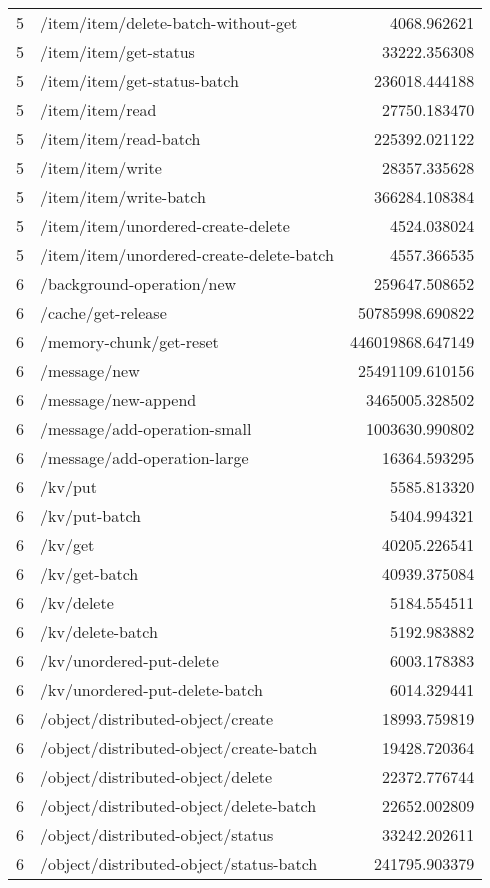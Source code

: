 \begin{longtable}{rlr}
5 & /item/item/delete-batch-without-get & 4068.962621 \\
5 & /item/item/get-status & 33222.356308 \\
5 & /item/item/get-status-batch & 236018.444188 \\
5 & /item/item/read & 27750.183470 \\
5 & /item/item/read-batch & 225392.021122 \\
5 & /item/item/write & 28357.335628 \\
5 & /item/item/write-batch & 366284.108384 \\
5 & /item/item/unordered-create-delete & 4524.038024 \\
5 & /item/item/unordered-create-delete-batch & 4557.366535 \\
6 & /background-operation/new & 259647.508652 \\
6 & /cache/get-release & 50785998.690822 \\
6 & /memory-chunk/get-reset & 446019868.647149 \\
6 & /message/new & 25491109.610156 \\
6 & /message/new-append & 3465005.328502 \\
6 & /message/add-operation-small & 1003630.990802 \\
6 & /message/add-operation-large & 16364.593295 \\
6 & /kv/put & 5585.813320 \\
6 & /kv/put-batch & 5404.994321 \\
6 & /kv/get & 40205.226541 \\
6 & /kv/get-batch & 40939.375084 \\
6 & /kv/delete & 5184.554511 \\
6 & /kv/delete-batch & 5192.983882 \\
6 & /kv/unordered-put-delete & 6003.178383 \\
6 & /kv/unordered-put-delete-batch & 6014.329441 \\
6 & /object/distributed-object/create & 18993.759819 \\
6 & /object/distributed-object/create-batch & 19428.720364 \\
6 & /object/distributed-object/delete & 22372.776744 \\
6 & /object/distributed-object/delete-batch & 22652.002809 \\
6 & /object/distributed-object/status & 33242.202611 \\
6 & /object/distributed-object/status-batch & 241795.903379 \\

\end{longtable}
